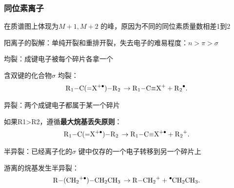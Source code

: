 \subsubsection*{同位素离子}%
\label{subsub*:同位素离子}
在质谱图上体现为$M+1, M+2$ 的峰，原因为不同的同位素质量数相差1到2
\begin{notation}
    阳离子的裂解：单纯开裂和重排开裂，失去电子的难易程度：$n>\pi>\sigma$

    均裂：成键电子被每个碎片各拿一个
    \begin{eg}
        含双键的化合物$\sigma$ 均裂：
        \[
        \ce{R_1-C(=X^{+.})-R_2 \to R_1-C#X^+ + R_2^.}
        .\]
    \end{eg}
    异裂：两个成键电子都属于某一个碎片
    \begin{eg}
        如果R1>R2，遵循\textbf{最大烷基丢失原则}：
        \[
        \ce{R_1-C(=X^{+.})-R_2 \to R_1-C#X^{+.} + R_2^+}
        .\]
    \end{eg}
    半异裂：已经离子化的$\sigma$ 键中仅存的一个电子转移到另一个碎片上
    \begin{eg}
        游离的烷基发生半异裂：\[
            \ce{R-(CH_2^{+.})-CH_2CH_3 \to R-CH_2^{+} + ^.CH_2CH_3}
        .\]
    \end{eg}
\end{notation}
